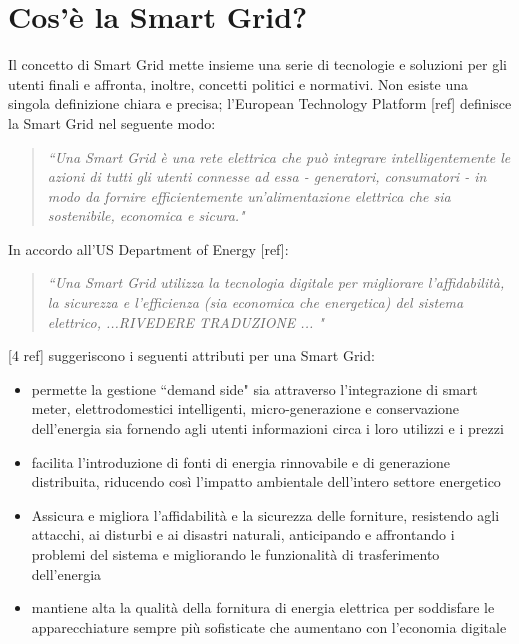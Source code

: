 \section{Cos'è la Smart Grid?}
Il concetto di Smart Grid mette insieme una serie di tecnologie e soluzioni per gli utenti finali e affronta, inoltre, concetti politici e normativi. \newline Non esiste una singola definizione chiara e precisa; l'European Technology Platform [ref] definisce la Smart Grid nel seguente modo:
\begin{quote}
\textit{``Una Smart Grid è una rete elettrica che può integrare intelligentemente le azioni di tutti gli utenti connesse ad essa - generatori, consumatori - in modo da fornire efficientemente un'alimentazione elettrica che sia sostenibile, economica e sicura."}
\end{quote}
In accordo all'US Department of Energy [ref]:
\begin{quote}
\textit{``Una Smart Grid utilizza la tecnologia digitale per migliorare l'affidabilità, la sicurezza e l'efficienza (sia economica che energetica) del sistema elettrico, ...RIVEDERE TRADUZIONE ... "}
\end{quote}
[4 ref] suggeriscono i seguenti attributi per una Smart Grid:
\begin{itemize}
\item permette la gestione ``demand side" sia attraverso l'integrazione di smart meter, elettrodomestici intelligenti, micro-generazione e conservazione dell'energia sia fornendo agli utenti informazioni circa i loro utilizzi e i prezzi
\item facilita l'introduzione di fonti di energia rinnovabile e di generazione distribuita, riducendo così l'impatto ambientale dell'intero settore energetico 
\item Assicura e migliora l'affidabilità e la sicurezza delle forniture, resistendo agli attacchi, ai disturbi e ai disastri naturali, anticipando e affrontando i problemi del sistema e migliorando le funzionalità di trasferimento dell'energia
\item mantiene alta la qualità della fornitura di energia elettrica per soddisfare le apparecchiature sempre più sofisticate che aumentano con l'economia digitale
\end{itemize}
\begin{figure}[h]
\end{figure}
